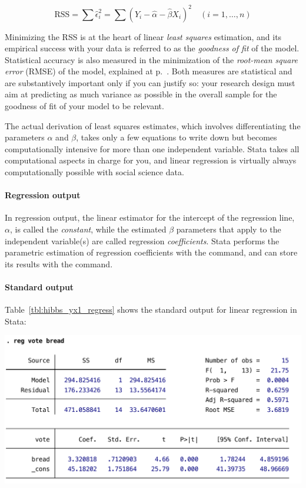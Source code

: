  $$\text{RSS} = \sum{\hat{\epsilon}_i^2} = \sum{(Y_i-\hat{\alpha}-\hat{\beta} X_i)^2} \quad (i = 1, \ldots, n)$$

  Minimizing the RSS is at the heart of linear \emph{least squares} estimation, and its empirical success with your data is referred to as the \emph{goodness of fit} of the model. Statistical accuracy is also measured in the minimization of the \emph{root-mean square error} (\label{rmse}RMSE) of the model, explained at p.~\pageref{rmse_explained}. Both measures are statistical and are substantively important only if you can justify so: your research design must aim at predicting as much variance as possible in the overall sample for the goodness of fit of your model to be relevant.

  The actual derivation of least squares estimates, which involves differentiating the parameters $\alpha$ and $\beta$, takes only a few equations to write down but becomes computationally intensive for more than one independent variable. Stata takes all computational aspects in charge for you, and linear regression is virtually always computationally possible with social science data.
  
  \paragraph{Regression output}

  In regression output, the linear estimator for the intercept of the regression line, $\alpha$, is called the \emph{constant}, while the estimated $\beta$ parameters that apply to the independent variable(s) are called regression \emph{coefficients}. Stata performs the parametric estimation of regression coefficients with the  command, and can store its results with the  command.

  \paragraph{Standard output}%
  Table~\ref{tbl:hibbs_yx1_regress} shows the standard output for linear regression in Stata:

  \begin{table}[htp]
      \includegraphics[scale=.5]{images/hibbs_yx1_regress.pdf}

    	\caption[Regression output for a simple linear model]{\label{tbl:hibbs_yx1_regress}%
  	Regression output for a simple linear model. %
  	\hibbs}
  \end{table}%

